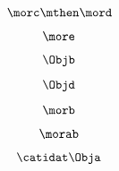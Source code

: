 \begin{forslides}
        
         \begin{equation}
            \label{eq:108}
            \morc \mthen \mord
        \end{equation}
        
        
         \begin{equation}
            \label{eq:109}
            \more
        \end{equation}
        
        
         \begin{equation}
            \label{eq:110}
            \Objb
        \end{equation}
        
        
        \begin{equation}
            \label{eq:111}
            \Objd
        \end{equation}
        
        
         \begin{equation}
            \label{eq:112}
            \morb
        \end{equation}
        
        
         \begin{equation}
            \label{eq:113}
            \morab
        \end{equation}
        
        
         \begin{equation}
            \label{eq:114}
            \catidat\Obja
        \end{equation}
        

\end{forslides}
